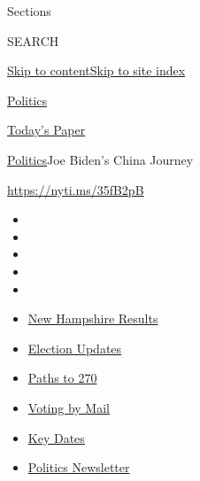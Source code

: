 Sections

SEARCH

\protect\hyperlink{site-content}{Skip to
content}\protect\hyperlink{site-index}{Skip to site index}

\href{https://www.nytimes3xbfgragh.onion/section/politics}{Politics}

\href{https://myaccount.nytimes3xbfgragh.onion/auth/login?response_type=cookie\&client_id=vi}{}

\href{https://www.nytimes3xbfgragh.onion/section/todayspaper}{Today's
Paper}

\href{/section/politics}{Politics}\textbar{}Joe Biden's China Journey

\url{https://nyti.ms/35fB2pB}

\begin{itemize}
\item
\item
\item
\item
\item
\end{itemize}

\begin{itemize}
\item
  \href{https://www.nytimes3xbfgragh.onion/interactive/2020/09/08/us/elections/results-new-hampshire-primary-elections.html?action=click\&pgtype=Article\&state=default\&region=TOP_BANNER\&context=storylines_menu}{New
  Hampshire Results}
\item
  \href{https://www.nytimes3xbfgragh.onion/live/2020/09/08/us/trump-vs-biden?action=click\&pgtype=Article\&state=default\&region=TOP_BANNER\&context=storylines_menu}{Election
  Updates}
\item
  \href{https://www.nytimes3xbfgragh.onion/interactive/2020/us/elections/election-states-biden-trump.html?action=click\&pgtype=Article\&state=default\&region=TOP_BANNER\&context=storylines_menu}{Paths
  to 270}
\item
  \href{https://www.nytimes3xbfgragh.onion/interactive/2020/08/31/us/politics/vote-by-mail-deadlines.html?action=click\&pgtype=Article\&state=default\&region=TOP_BANNER\&context=storylines_menu}{Voting
  by Mail}
\item
  \href{https://www.nytimes3xbfgragh.onion/interactive/2019/us/elections/2020-presidential-election-calendar.html?action=click\&pgtype=Article\&state=default\&region=TOP_BANNER\&context=storylines_menu}{Key
  Dates}
\item
  \href{https://www.nytimes3xbfgragh.onion/newsletters/politics?action=click\&pgtype=Article\&state=default\&region=TOP_BANNER\&context=storylines_menu}{Politics
  Newsletter}
\end{itemize}

